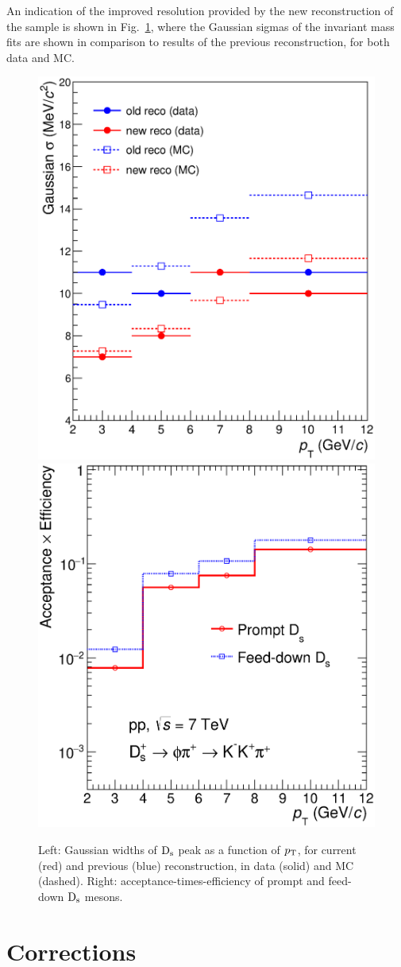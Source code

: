 An indication of the improved resolution provided by the new 
reconstruction of the sample is shown in Fig.~\ref{fig:sigma4vs2}, where the 
Gaussian sigmas of the invariant mass fits are shown in comparison to 
results of the previous reconstruction, for both data and MC. 
\begin{figure}[!hb]
\begin{center}
\includegraphics[width=.48\textwidth]{FigCap4/Resolutions_pass2_pass4.eps}
\includegraphics[width=.48\textwidth]{FigCap4/AccEff_Ds_Pass4.eps}
\caption{Left: Gaussian widths of ${\rm D_s}$ peak as a function of $p_{\rm T}$, for current (red) and previous (blue) reconstruction, in data (solid) and MC (dashed). Right: acceptance-times-efficiency of prompt and feed-down ${\rm D_s}$ mesons.}
\label{fig:sigma4vs2}
\end{center}
\end{figure}

\section{Corrections}

